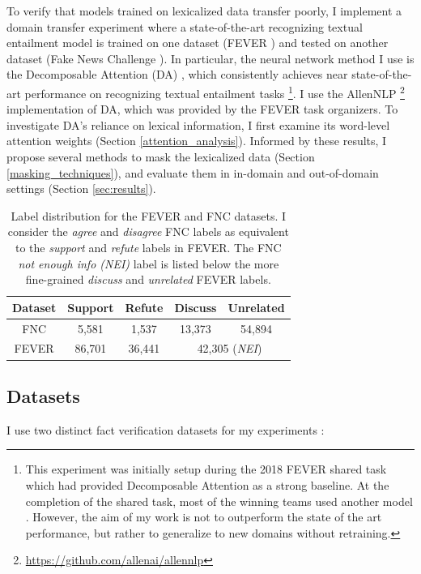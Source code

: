 \documentclass{article}
\begin{document}
To verify that models trained on lexicalized data transfer poorly, I implement a domain transfer experiment where a state-of-the-art recognizing textual entailment model is trained on one dataset (FEVER \citep*{thorne2018fever}) and tested on another dataset (Fake News Challenge \citep*{pomerleau2017fake}). In particular, the neural network method I use is the Decomposable Attention (DA) \citep*{parikh2016decomposable}, which consistently achieves near state-of-the-art performance on recognizing textual entailment tasks \footnote{This experiment was initially setup during the 2018 FEVER shared task which had provided Decomposable Attention as a strong baseline. At the completion of the shared task, most of the winning teams used another model \citep*{chen2016enhanced}. However, the aim of my work is not to outperform the state of the art performance, but rather to generalize to new domains without retraining.}.  I use the AllenNLP \footnote{\url{https://github.com/allenai/allennlp}}
implementation of DA, which was provided by the FEVER task organizers. To investigate DA's reliance on lexical information, I first examine its word-level attention weights (Section \ref{attention_analysis}). 
Informed by these results, I propose several methods to mask the lexicalized data (Section \ref{masking_techniques}), and evaluate them in in-domain and  out-of-domain settings (Section \ref{sec:results}).




\begin{table}
    \centering
    \footnotesize
    \begin{tabular}{ccccc}
        Dataset & Support & Refute & Discuss & Unrelated \\
        \hline
        FNC    & 5,581 & 1,537  & 13,373 & 54,894 \\
        FEVER  &  86,701 & 36,441  & \multicolumn{2}{c}{42,305 (\textit{NEI})} \\  
    \end{tabular}
    \caption{Label distribution for the FEVER and FNC datasets.  I consider the \textit{agree} and \textit{disagree} FNC labels as equivalent to the \textit{support} and \textit{refute} labels in FEVER. The FNC \textit{not enough info (NEI)} label is listed below the more fine-grained \textit{discuss} and \textit{unrelated} FEVER labels.  }
    \label{tab:data}
\end{table}

\subsection{Datasets}
I use two distinct fact verification datasets for my experiments :
\end{document}
